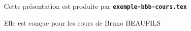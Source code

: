   \item Cette présentation est produite par \texttt{\textbf{exemple-bbb-cours.tex}}
  \item Elle est conçue pour les cours de Bruno BEAUFILS
